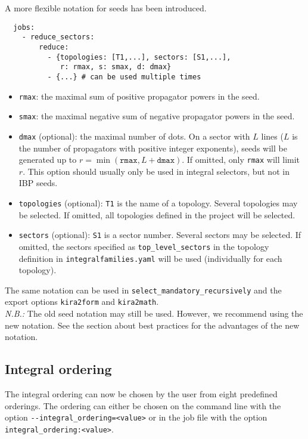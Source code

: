 \documentclass[a4paper,12pt]{article}
\begin{document}
A more flexible notation for seeds has been introduced.
%
\begin{verbatim}
  jobs:
    - reduce_sectors:
        reduce:
          - {topologies: [T1,...], sectors: [S1,...],
             r: rmax, s: smax, d: dmax}
          - {...} # can be used multiple times
\end{verbatim}
%
\begin{itemize}
  \item \texttt{rmax}: the maximal sum of positive propagator powers in the
        seed.
  \item \texttt{smax}: the maximal negative sum of negative propagator powers
        in the seed.
  \item \texttt{dmax} (optional): the maximal number of dots.
        On a sector with $L$ lines ($L$ is the number of propagators with
        positive integer exponents), seeds will be generated up to
        $r=\min(\texttt{rmax},L+\texttt{dmax})$.
        If omitted, only \texttt{rmax} will limit $r$.
        This option should usually only be used in integral selectors, but not
        in IBP seeds.
  \item \texttt{topologies} (optional): \texttt{T1} is the name of a topology.
        Several topologies may be selected.
        If omitted, all topologies defined in the project will be selected.
  \item \texttt{sectors} (optional): \texttt{S1} is a sector number.
        Several sectors may be selected.
        If omitted, the sectors specified as \texttt{top\_level\_sectors} in the
        topology definition in \texttt{integralfamilies.yaml} will be used
        (individually for each topology).
\end{itemize}
%
The same notation can be used in \texttt{select\_mandatory\_recursively} and the
export options \texttt{kira2form} and \texttt{kira2math}.
\medskip\\
\noindent
\textit{N.B.:} The old seed notation may still be used.
However, we recommend using the new notation.
See the section about best practices for the advantages of the new notation.


\subsection{Integral ordering}
\label{sect:integralordering}

The integral ordering can now be chosen by the user from eight predefined
orderings. The ordering can either be chosen on the command line with the option
\texttt{-{}-integral\_ordering=<value>} or in the job file with the option
\texttt{integral\_ordering:\;<value>}.
\end{document}
